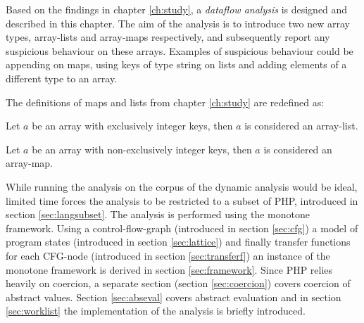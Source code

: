 Based on the findings in chapter \ref{ch:study}, a \emph{dataflow analysis} is designed and described in this chapter. The aim of the analysis is to introduce two new array types, array-lists and array-maps respectively, and subsequently report any suspicious behaviour on these arrays. Examples of suspicious behaviour could be appending on maps, using keys of type string on lists and adding elements of a different type to an array.

The definitions of maps and lists from chapter \ref{ch:study} are redefined as:

\begin{definition}
Let $a$ be an array with exclusively integer keys, then $a$ is considered an array-list.
\end{definition}

\begin{definition}
Let $a$ be an array with non-exclusively integer keys, then $a$ is considered an array-map.
\end{definition}

While running the analysis on the corpus of the dynamic analysis would be ideal, limited time forces the analysis to be restricted to a subset of PHP, introduced in section \ref{sec:langsubset}. The analysis is performed using the monotone framework. Using a control-flow-graph (introduced in section \ref{sec:cfg}) a model of program states (introduced in section \ref{sec:lattice}) and finally transfer functions for each CFG-node (introduced in section \ref{sec:transferf}) an instance of the monotone framework is derived in section \ref{sec:framework}. Since PHP relies heavily on coercion, a separate section (section \ref{sec:coercion}) covers coercion of abstract values. Section \ref{sec:abseval} covers abstract evaluation and in section \ref{sec:worklist} the implementation of the analysis is briefly introduced.

